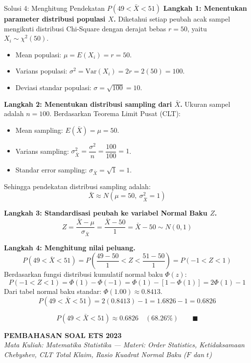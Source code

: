 \documentclass[10pt,twoside]{article}
\newcommand{\paketsoal}[2]{
  \newpage
  \markright{#1}
  \begin{center}
    {\large\bfseries #1}\\[2pt]
    {\normalsize\itshape #2}
  \end{center}
  \vspace{0.2cm}
}
\begin{document}
\begin{solbox}{Solusi 4: Menghitung Pendekatan $P(49 < \bar{X} < 51)$}
\textbf{Langkah 1: Menentukan parameter distribusi populasi $X$.}
Diketahui setiap peubah acak sampel mengikuti distribusi Chi-Square dengan derajat bebas $r = 50$, yaitu $X_i \sim \chi^2(50)$.
\begin{itemize}
  \item Mean populasi: $\mu = E(X_i) = r = 50$.
  \item Varians populasi: $\sigma^2 = \mathrm{Var}(X_i) = 2r = 2(50) = 100$.
  \item Deviasi standar populasi: $\sigma = \sqrt{100} = 10$.
\end{itemize}

\textbf{Langkah 2: Menentukan distribusi sampling dari $\bar{X}$.}
Ukuran sampel adalah $n = 100$. Berdasarkan Teorema Limit Pusat (CLT):
\begin{itemize}
  \item Mean sampling: $E(\bar{X}) = \mu = 50$.
  \item Varians sampling: $\sigma_{\bar{X}}^2 = \dfrac{\sigma^2}{n} = \dfrac{100}{100} = 1$.
  \item Standar error sampling: $\sigma_{\bar{X}} = \sqrt{1} = 1$.
\end{itemize}
Sehingga pendekatan distribusi sampling adalah:
\[
\bar{X} \approx N(\mu = 50, \ \sigma_{\bar{X}}^2 = 1)
\]

\textbf{Langkah 3: Standardisasi peubah ke variabel Normal Baku $Z$.}
\[
Z = \frac{\bar{X} - \mu}{\sigma_{\bar{X}}} = \frac{\bar{X} - 50}{1} = \bar{X} - 50 \sim N(0, 1)
\]

\textbf{Langkah 4: Menghitung nilai peluang.}
\[
P(49 < \bar{X} < 51) = P\left(\frac{49 - 50}{1} < Z < \frac{51 - 50}{1}\right) = P(-1 < Z < 1)
\]
Berdasarkan fungsi distribusi kumulatif normal baku $\Phi(z)$:
\[
P(-1 < Z < 1) = \Phi(1) - \Phi(-1) = \Phi(1) - [1 - \Phi(1)] = 2\Phi(1) - 1
\]
Dari tabel normal baku standar: $\Phi(1.00) \approx 0.8413$.
\[
P(49 < \bar{X} < 51) = 2(0.8413) - 1 = 1.6826 - 1 = 0.6826
\]

\[
\boxed{P(49 < \bar{X} < 51) \approx 0.6826 \quad (68.26\%)} \qquad \blacksquare
\]
\end{solbox}

\paketsoal{PEMBAHASAN SOAL ETS 2023}{%
Mata Kuliah: Matematika Statistika --- Materi: Order Statistics, Ketidaksamaan Chebyshev, CLT Total Klaim, Rasio Kuadrat Normal Baku ($F$ dan $t$)}
\end{document}
